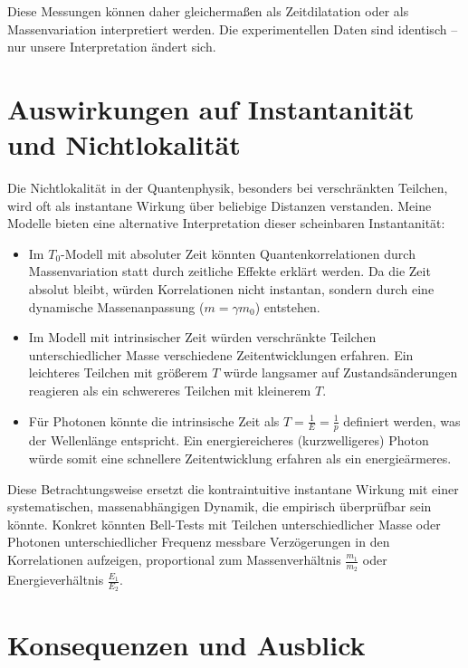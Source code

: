 \documentclass[a4paper,12pt]{article}
\begin{document}
	Diese Messungen können daher gleichermaßen als Zeitdilatation oder als Massenvariation interpretiert werden. Die experimentellen Daten sind identisch -- nur unsere Interpretation ändert sich.
	
	\section{Auswirkungen auf Instantanität und Nichtlokalität}
	
	Die Nichtlokalität in der Quantenphysik, besonders bei verschränkten Teilchen, wird oft als instantane Wirkung über beliebige Distanzen verstanden. Meine Modelle bieten eine alternative Interpretation dieser scheinbaren Instantanität:
	
	\begin{itemize}
		\item Im $T_0$-Modell mit absoluter Zeit könnten Quantenkorrelationen durch Massenvariation statt durch zeitliche Effekte erklärt werden. Da die Zeit absolut bleibt, würden Korrelationen nicht instantan, sondern durch eine dynamische Massenanpassung ($m = \gamma m_0$) entstehen.
		
		\item Im Modell mit intrinsischer Zeit würden verschränkte Teilchen unterschiedlicher Masse verschiedene Zeitentwicklungen erfahren. Ein leichteres Teilchen mit größerem $T$ würde langsamer auf Zustandsänderungen reagieren als ein schwereres Teilchen mit kleinerem $T$.
		
		\item Für Photonen könnte die intrinsische Zeit als $T = \frac{1}{E} = \frac{1}{p}$ definiert werden, was der Wellenlänge entspricht. Ein energiereicheres (kurzwelligeres) Photon würde somit eine schnellere Zeitentwicklung erfahren als ein energieärmeres.
	\end{itemize}
	
	Diese Betrachtungsweise ersetzt die kontraintuitive instantane Wirkung mit einer systematischen, massenabhängigen Dynamik, die empirisch überprüfbar sein könnte. Konkret könnten Bell-Tests mit Teilchen unterschiedlicher Masse oder Photonen unterschiedlicher Frequenz messbare Verzögerungen in den Korrelationen aufzeigen, proportional zum Massenverhältnis $\frac{m_1}{m_2}$ oder Energieverhältnis $\frac{E_1}{E_2}$.
	
	\section{Konsequenzen und Ausblick}
	
\end{document}
